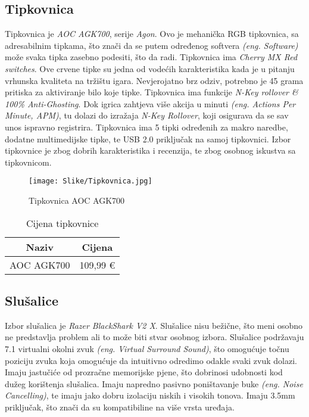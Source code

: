 \documentclass{article}
\begin{document}
    \subsection{Tipkovnica}
    Tipkovnica je \textit{AOC AGK700}, serije \textit{Agon}. Ovo je mehanička RGB tipkovnica, sa adresabilnim tipkama, što znači da se putem određenog softvera \emph{(eng. Software)} može svaka tipka zasebno podesiti, što da radi. Tipkovnica ima \textit{Cherry MX Red switches}. Ove crvene tipke su jedna od vodećih karakteristika kada je u pitanju vrhunska kvaliteta na tržištu igara. Nevjerojatno brz odziv, potrebno je 45 grama pritiska za aktiviranje bilo koje tipke. Tipkovnica ima funkcije \textit{N-Key rollover \& 100\% Anti-Ghosting}. Dok igrica zahtjeva više akcija u minuti \emph{(eng. Actions Per Minute, APM)}, tu dolazi do izražaja \textit{N-Key Rollover}, koji osigurava da se sav unos ispravno registrira. Tipkovnica ima 5 tipki određenih za makro naredbe, dodatne multimedijske tipke, te USB 2.0 priključak na samoj tipkovnici. Izbor tipkovnice je zbog dobrih karakteristika i recenzija, te zbog osobnog iskustva sa tipkovnicom.

    \begin{figure}[H]
        \centering
        \texttt{[image: Slike/Tipkovnica.jpg]}
        \caption{Tipkovnica AOC AGK700}
        \label{fig:Tipkovnica}
    \end{figure}

    \begin{table}[H]
        \centering
        \begin{tabular}{|c|c|}
            \hline
            Naziv & Cijena \\
            \hline
            AOC AGK700 & 109,99 € \\
            \hline
        \end{tabular}
        \caption{Cijena tipkovnice}
        \label{tab:Tipkovnica}
    \end{table}

    \clearpage
    \subsection{Slušalice}
    Izbor slušalica je \textit{Razer BlackShark V2 X}. Slušalice nisu bežične, što meni osobno ne predstavlja problem ali to može biti stvar osobnog izbora. Slušalice podržavaju 7.1 virtualni okolni zvuk \emph{(eng. Virtual Surround Sound)}, što omogućuje točnu poziciju zvuka koja omogućuje da intuitivno odredimo odakle svaki zvuk dolazi. Imaju jastučiće od prozračne memorijske pjene, što dobrinosi udobnosti kod dužeg korištenja slušalica. Imaju napredno pasivno poništavanje buke \emph{(eng. Noise Cancelling)}, te imaju jako dobru izolaciju niskih i visokih tonova. Imaju 3.5mm priključak, što znači da su kompatibiline na više vrsta uređaja.
\end{document}
